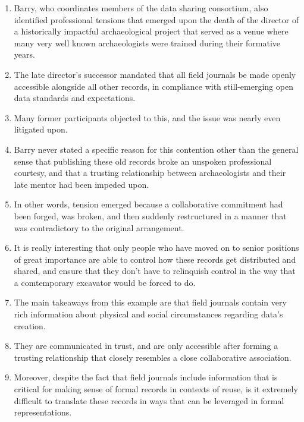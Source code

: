 \documentclass[12pt]{article}
\begin{document}
\begin{enumerate}
  \item Barry, who coordinates members of the data sharing consortium, also identified professional tensions that emerged upon the death of the director of a historically impactful archaeological project that served as a venue where many very well known archaeologists were trained during their formative years.
  \item The late director's successor mandated that all field journals be made openly accessible alongside all other records, in compliance with still-emerging open data standards and expectations.
  \item Many former participants objected to this, and the issue was nearly even litigated upon.
  \item Barry never stated a specific reason for this contention other than the general sense that publishing these old records broke an unspoken professional courtesy, and that a trusting relationship between archaeologists and their late mentor had been impeded upon.
  \item In other words, tension emerged because a collaborative commitment had been forged, was broken, and then suddenly restructured in a manner that was contradictory to the original arrangement.
  \item It is really interesting that only people who have moved on to senior positions of great importance are able to control how these records get distributed and shared, and ensure that they don't have to relinquish control in the way that a comtemporary excavator would be forced to do.

  \item The main takeaways from this example are that field journals contain very rich information about physical and social circumstances regarding data’s creation.
  \item They are communicated in trust, and are only accessible after forming a trusting relationship that closely resembles a close collaborative association.
  \item Moreover, despite the fact that field journals include information that is critical for making sense of formal records in contexts of reuse, is it extremely difficult to translate these records in ways that can be leveraged in formal representations.
\end{enumerate}
\end{document}

